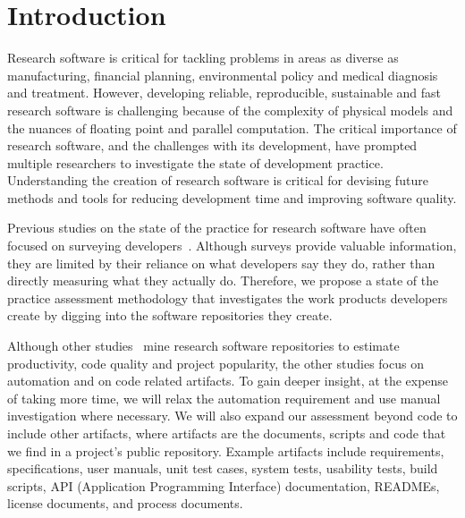 \documentclass[runningheads]{llncs}
\begin{document}
\section{Introduction} \label{SecIntroduction}

Research software is critical for tackling problems in areas as diverse as
manufacturing, financial planning, environmental policy and medical diagnosis
and treatment.  However, developing reliable, reproducible, sustainable and fast
research software is challenging because of the complexity of physical models
and the nuances of floating point and parallel computation. The critical
importance of research software, and the challenges with its development, have
prompted multiple researchers to investigate the state of development practice.
Understanding the creation of research software is critical for devising future
methods and tools for reducing development time and improving software quality.

Previous studies on the state of the practice for research software have often
focused on surveying
developers~\cite{HannayEtAl2009,Nguyen-HoanEtAl2010,PintoEtAl2018}. Although
surveys provide valuable information, they are limited by their reliance on what
developers say they do, rather than directly measuring what they actually do.
Therefore, we propose a state of the practice assessment methodology that
investigates the work products developers create by digging into the
software repositories they create.

Although other studies~\cite{GrannanEtAl2020,SoodEtAl2019} mine research
software repositories to estimate productivity, code quality and project
popularity, the other studies focus on automation and on code related artifacts.
To gain deeper insight, at the expense of taking more time, we will relax the
automation requirement and use manual investigation where necessary.  We will
also expand our assessment beyond code to include other artifacts, where
artifacts are the documents, scripts and code that we find in a project's public
repository. Example artifacts include requirements, specifications, user
manuals, unit test cases, system tests, usability tests, build scripts, API
(Application Programming Interface) documentation, READMEs, license documents,
and process documents.
\end{document}
